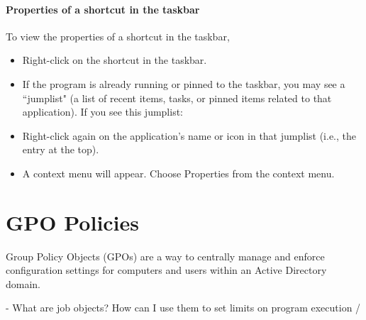 \documentclass{article}
\begin{document}
\paragraph{Properties of a shortcut in the taskbar}
To view the properties of a shortcut in the taskbar, 
\begin{itemize}
\item Right-click on the shortcut in the taskbar.
\item If the program is already running or pinned to the taskbar, you may see a ``jumplist" (a list of recent items, tasks, or pinned items related to that application). If you see this jumplist:
\item Right-click again on the application's name or icon in that jumplist (i.e., the entry at the top).
\item A context menu will appear. Choose Properties from the context menu.
\end{itemize}

\section{GPO Policies}
Group Policy Objects (GPOs) are a way to centrally manage 
and enforce configuration settings for computers 
and users within an Active Directory domain.

- What are job objects? How can I use them to set limits on program execution / 
\end{document}
